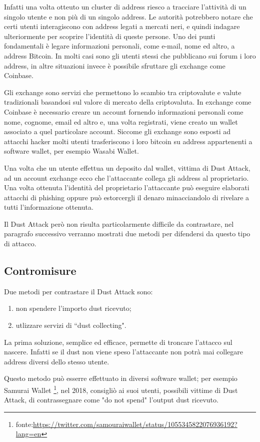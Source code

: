Infatti una volta otteuto un cluster di address riesco a tracciare l'attività di un singolo utente e non più di un singolo address. Le autorità potrebbero notare che certi utenti interagiscono con address legati a mercati neri, e quindi indagare ulteriormente per scoprire l'identità di queste persone. Uno dei punti fondamentali è legare informazioni personali, come e-mail, nome ed altro, a address Bitcoin. In molti casi sono gli utenti stessi che pubblicano sui forum i loro address, in altre situazioni invece è possibile sfruttare gli exchange come Coinbase.

Gli exchange sono servizi che permettono lo scambio tra criptovalute e valute tradizionali basandosi sul valore di mercato della criptovaluta. In exchange come Coinbase è necessario creare un account fornendo informazioni personali come nome, cognome, email ed altro e, una volta registrati, viene creato un wallet associato a quel particolare account. Siccome gli exchange sono esposti ad attacchi hacker molti utenti trasferiscono i loro bitcoin su address appartenenti a software wallet, per esempio Wasabi Wallet.

Una volta che un utente effettua un deposito dal wallet, vittima di Dust Attack, ad un account exchange ecco che l'attaccante collega gli address al proprietario. Una volta ottenuta l'identità del proprietario l'attaccante può eseguire elaborati attacchi di phishing oppure può estorcergli il denaro minacciandolo di rivelare a tutti l'informazione ottenuta. 

Il Dust Attack però non risulta particolarmente difficile da contrastare, nel paragrafo successivo verranno mostrati due metodi per difendersi da questo tipo di attacco.
\subsection{Contromisure}
Due metodi per contrastare il Dust Attack sono:
    \begin{enumerate}
        \item non spendere l'importo dust ricevuto; 
        \item utlizzare servizi di ``dust collecting". 
    \end{enumerate}
    
La prima soluzione, semplice ed efficace, permette di troncare l'attacco sul nascere. Infatti se il dust non viene speso l'attaccante non potrà mai collegare address diversi dello stesso utente. 

Questo metodo può esserre effettuato in diversi software wallet; per esempio Samurai Wallet \footnote{fonte:\url{https://twitter.com/samouraiwallet/status/1055345822076936192?lang=en}}, nel 2018, consigliò ai suoi utenti, possibili vittime di Dust Attack,  di contrassegnare come "do not spend" l'output dust ricevuto.

